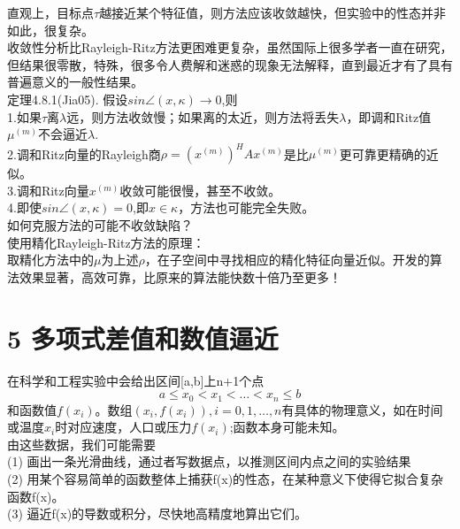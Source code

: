 \documentclass[a4paper,12pt]{article}
\begin{document}
\begin{CJK*}{UTF8}{gbsn}
	直观上，目标点$\tau$越接近某个特征值，则方法应该收敛越快，但实验中的性态并非如此，很复杂。\\
	收敛性分析比Rayleigh-Ritz方法更困难更复杂，虽然国际上很多学者一直在研究，但结果很零散，特殊，很多令人费解和迷惑的现象无法解释，直到最近才有了具有普遍意义的一般性结果。\\
	定理4.8.1(Jia05). 假设$sin\angle(x,\kappa)\to 0$,则\\
	1.如果$\tau$离$\lambda$远，则方法收敛慢；如果离的太近，则方法将丢失$\lambda$，即调和Ritz值$\mu^{(m)}$不会逼近$\lambda$.\\
	2.调和Ritz向量的Rayleigh商$\rho = (x^{(m)})^HAx^{(m)}$是比$\mu^{(m)}$更可靠更精确的近似。\\
	3.调和Ritz向量$x^{(m)}$收敛可能很慢，甚至不收敛。\\
	4.即使$sin\angle(x,\kappa)=0$,即$x\in \kappa$，方法也可能完全失败。\\
	如何克服方法的可能不收敛缺陷？\\
	使用精化Rayleigh-Ritz方法的原理：\\
	取精化方法中的$\mu$为上述$\rho$，在子空间中寻找相应的精化特征向量近似。开发的算法效果显著，高效可靠，比原来的算法能快数十倍乃至更多！\\
	\section{5 多项式差值和数值逼近}
	在科学和工程实验中会给出区间[a,b]上n+1个点
	$$a\le x_0 < x_1 < \ldots < x_n \le b$$
	和函数值$f(x_i)$。数组$(x_i,f(x_i)),i=0,1,\ldots,n$有具体的物理意义，如在时间或温度$x_i$时对应速度，人口或压力$f(x_i)$;函数本身可能未知。\\
	由这些数据，我们可能需要\\
	(1) 画出一条光滑曲线，通过者写数据点，以推测区间内点之间的实验结果\\
	(2) 用某个容易简单的函数整体上捕获f(x)的性态，在某种意义下使得它拟合复杂函数f(x)。\\
	(3) 逼近f(x)的导数或积分，尽快地高精度地算出它们。\\

\end{CJK*}
\end{document}
